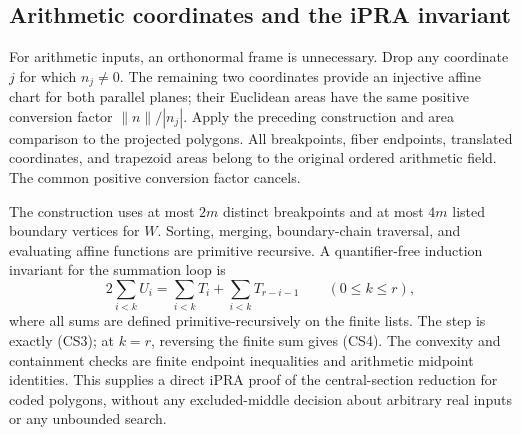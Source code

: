 \subsection{Arithmetic coordinates and the iPRA invariant}
For arithmetic inputs, an orthonormal frame is unnecessary.  Drop any
coordinate $j$ for which $n_j\ne0$.  The remaining two coordinates
provide an injective affine chart for both parallel planes; their
Euclidean areas have the same positive conversion factor
$\|n\|/|n_j|$.  Apply the preceding construction and area comparison to
the projected polygons.  All breakpoints, fiber endpoints, translated
coordinates, and trapezoid areas belong to the original ordered
arithmetic field.  The common positive conversion factor cancels.

The construction uses at most $2m$ distinct breakpoints and at most
$4m$ listed boundary vertices for $W$.  Sorting, merging, boundary-chain
traversal, and evaluating affine functions are primitive recursive.
A quantifier-free induction invariant for the summation loop is
\[
 2\sum_{i<k}U_i
   =\sum_{i<k}T_i+\sum_{i<k}T_{r-i-1}
 \qquad(0\le k\le r),                              \tag{CS5}
\]
where all sums are defined primitive-recursively on the finite lists.
The step is exactly (CS3); at $k=r$, reversing the finite sum gives
(CS4).  The convexity and containment checks are finite endpoint
inequalities and arithmetic midpoint identities.  This supplies a
direct iPRA proof of the central-section reduction for coded polygons,
without any excluded-middle decision about arbitrary real inputs or
any unbounded search.
